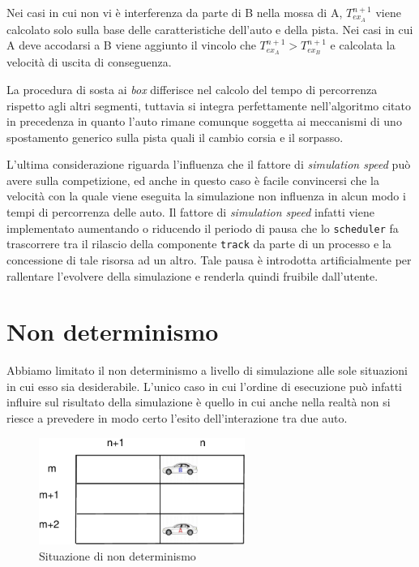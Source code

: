 \documentclass[a4paper]{report}
\begin{document}
Nei casi in cui non vi è interferenza da parte di B nella mossa di A, $T_{ex_A}^{n+1}$ viene calcolato solo sulla base delle caratteristiche dell'auto e della pista.
Nei casi in cui A deve accodarsi a B viene aggiunto il vincolo che $T_{ex_A}^{n+1} > T_{ex_B}^{n+1}$ e calcolata la velocità di uscita di conseguenza.

La procedura di sosta ai \textit{box} differisce nel calcolo del tempo di percorrenza rispetto agli altri segmenti, tuttavia si integra perfettamente nell'algoritmo citato in precedenza in quanto l'auto rimane comunque soggetta ai meccanismi di uno spostamento generico sulla pista quali il cambio corsia e il sorpasso.


L'ultima considerazione riguarda l'influenza che il fattore di \textit{simulation speed} può avere sulla competizione, ed anche in questo caso è facile convincersi che la velocità con la quale viene eseguita la simulazione non influenza in alcun modo i tempi di percorrenza delle auto. Il fattore di \textit{simulation speed} infatti viene implementato aumentando o riducendo il periodo di pausa che lo \texttt{scheduler} fa trascorrere tra il rilascio della componente \texttt{track} da parte di un processo e la concessione di tale risorsa ad un altro. Tale pausa è introdotta artificialmente per rallentare l'evolvere della simulazione e renderla quindi fruibile dall'utente.

\section{Non determinismo}
Abbiamo limitato il non determinismo a livello di simulazione alle sole situazioni in cui esso sia desiderabile. L'unico caso in cui l'ordine di esecuzione può infatti influire sul risultato della simulazione è quello in cui anche nella realtà non si riesce a prevedere in modo certo l'esito dell'interazione tra due auto.

\begin{figure}
\begin{center}
\includegraphics[width=0.6\textwidth]{diagrammi/NonDet}
\caption{Situazione di non determinismo}
\label{fig:nonDet}
\end{center}
\end{figure}
\end{document}
